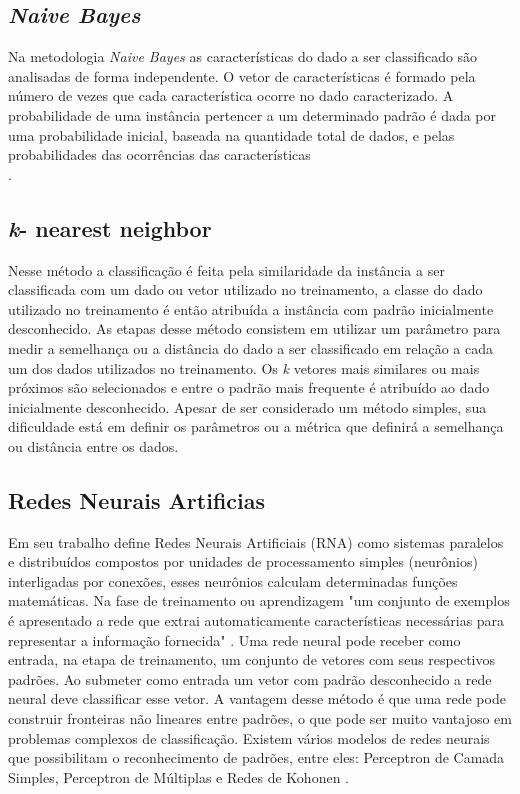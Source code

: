 \subsection{\it Naive Bayes}
Na metodologia \textit{Naive Bayes} as características do dado a ser classificado são analisadas de forma independente. O vetor de características é formado pela número de vezes que cada característica ocorre no dado caracterizado. A probabilidade de uma instância pertencer a um determinado padrão é dada por uma probabilidade inicial, baseada na quantidade total de dados, e pelas probabilidades das ocorrências das características \cite{McCallum98Bayes} \\
\cite{Langley92Bayes}. %

\subsection{\textit{k}- nearest neighbor}
Nesse método a classificação é feita pela similaridade da instância a ser classificada com um dado ou vetor utilizado no treinamento, a classe do dado utilizado no treinamento é então atribuída a instância com padrão inicialmente desconhecido. As etapas desse método consistem em utilizar um parâmetro para medir a semelhança ou a distância do dado a ser classificado em relação a cada um dos dados utilizados no treinamento. Os \textit{k} vetores mais similares ou mais próximos são selecionados e entre o padrão mais frequente é atribuído ao dado inicialmente desconhecido. Apesar de ser considerado um método simples, sua dificuldade está em definir os parâmetros ou a métrica que definirá a semelhança ou distância entre os dados\cite{Chagas09KNN}.

\subsection{Redes Neurais Artificias}
Em seu trabalho   define Redes Neurais Artificiais (RNA) como sistemas paralelos e distribuídos compostos por unidades de processamento simples (neurônios) interligadas por conexões, esses neurônios calculam determinadas funções matemáticas. Na fase de treinamento ou aprendizagem "um conjunto de exemplos é apresentado a rede que extrai automaticamente características necessárias para representar a informação fornecida" \cite{Morais2010RNA}.
Uma rede neural pode receber como entrada, na etapa de treinamento, um conjunto de vetores com seus respectivos padrões. Ao submeter como entrada um vetor com padrão desconhecido a rede neural deve classificar esse vetor. A vantagem desse método é que uma rede pode construir fronteiras não lineares entre padrões, o que pode ser muito vantajoso em problemas complexos de classificação. Existem vários modelos de redes neurais que possibilitam o reconhecimento de padrões, entre eles: Perceptron de Camada Simples, Perceptron de Múltiplas e Redes de Kohonen \cite{ZubenRNA2}.

